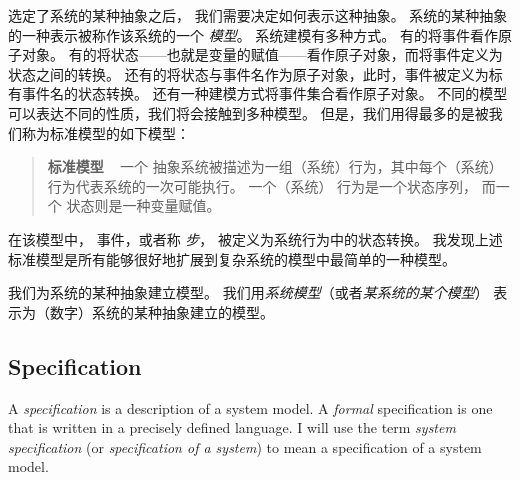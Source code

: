 \begin{ch}
  选定了系统的某种抽象之后，
  我们需要决定如何表示这种抽象。
  系统的某种抽象的一种表示被称作该系统的一个%
  \emph{模型}。
  系统建模有多种方式。
  有的将事件看作原子对象。
  有的将状态——也就是变量的赋值——看作原子对象，而将事件定义为状态之间的转换。
  还有的将状态与事件名作为原子对象，此时，事件被定义为标有事件名的状态转换。
  还有一种建模方式将事件集合看作原子对象。
  不同的模型可以表达不同的性质，我们将会接触到多种模型。
  但是，我们用得最多的是被我们称为标准模型的如下模型：
  \begin{quote}
    \textbf{标准模型} \  
    一个%
    抽象系统被描述为一组（系统）行为，其中每个（系统）行为代表系统的一次可能执行。
    一个（系统）%
    行为是一个状态序列，
    而一个%
    状态则是一种变量赋值。
  \end{quote}
  在该模型中，%
  事件，或者称%
  \emph{步}，
  被定义为系统行为中的状态转换。
  我发现上述标准模型是所有能够很好地扩展到复杂系统的模型中最简单的一种模型。

  我们为系统的某种抽象建立模型。
  我们用\emph{系统模型}（或者\emph{某系统的某个模型}）
  表示为（数字）系统的某种抽象建立的模型。
\end{ch}


%
\vspace{-\baselineskip}
\subsection{Specification}    
A \emph{specification} 
is a description of a system model.  A
\emph{formal} specification is one that is written in a precisely
defined language.  I will use the term \emph{system specification} (or
\emph{specification of a system}) to mean a specification of a system
model.  


